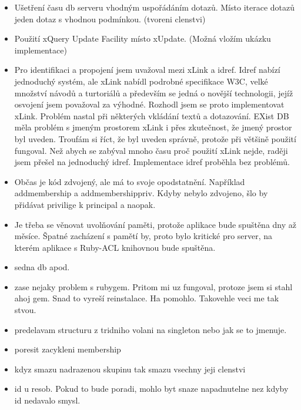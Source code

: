 \documentclass[11pt,twoside,a4paper]{book}
\begin{document}
\begin{itemize}
\item Ušetření času db serveru vhodným uspořádáním dotazů. Místo iterace dotazů jeden dotaz s vhodnou podmínkou. (tvoreni clenstvi) 

\item Použití xQuery Update Facility místo xUpdate. (Možná vložím ukázku implementace)

\item Pro identifikaci a propojení jsem uvažoval mezi xLink a idref. Idref nabízí jednoduchý systém, ale xLink nabídl podrobné specifikace W3C, velké množství návodů a turtoriálů a především se jedná o novější technologii, jejíž osvojení jsem považoval za výhodné. Rozhodl jsem se proto implementovat xLink. Problém nastal při některých vkládání textů a dotazování. EXist DB měla problém s jmeným prostorem xLink i přes zkutečnost, že jmený prostor byl uveden. Troufám si říct, že byl uveden správně, protože při většině použití fungoval. Než abych se zabýval mnoho času proč použití xLink nejde, raději jsem přešel na jednoduchý idref. Implementace idref proběhla bez problémů.

\item Občas je kód zdvojený, ale má to svoje opodstatnění. Například addmembership a addmembershippriv. Kdyby nebylo zdvojeno, šlo by přidávat privilige k principal a naopak.

\item Je třeba se věnovat uvolňování paměti, protože aplikace bude spuštěna dny až měsíce. Špatné zacházení s pamětí by, proto bylo kritické pro server, na kterém aplikace s Ruby-ACL knihovnou bude spuštěna.

\item sedna db apod.

\item zase nejaky problem s rubygem. Pritom mi uz fungoval, protoze jsem si stahl ahoj gem. Snad to vyreší reinstalace. Ha pomohlo. Takovehle veci me tak stvou. 

\item predelavam structuru z tridniho volani na singleton nebo jak se to jmenuje.

\item poresit zacykleni membership

\item kdyz smazu nadrazenou skupinu tak smazu vsechny jeji clenstvi

\item id u resob. Pokud to bude poradi, mohlo byt snaze napadnutelne nez kdyby id nedavalo smysl.


\end{itemize}
\end{document}
